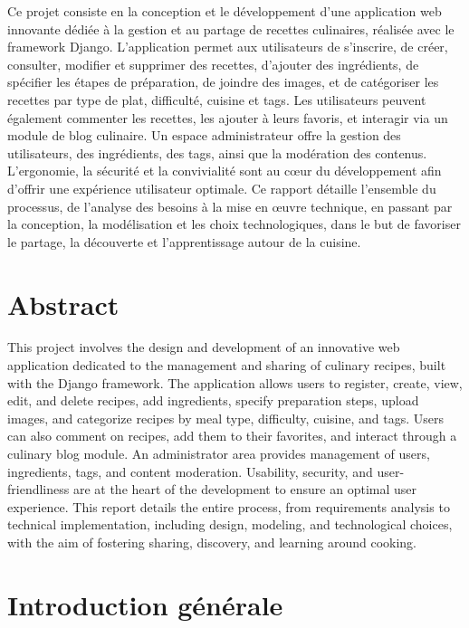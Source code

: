 \documentclass[12pt,a4paper]{report}
\begin{document}
Ce projet consiste en la conception et le développement d’une application web innovante dédiée à la gestion et au partage de recettes culinaires, réalisée avec le framework Django. L’application permet aux utilisateurs de s’inscrire, de créer, consulter, modifier et supprimer des recettes, d’ajouter des ingrédients, de spécifier les étapes de préparation, de joindre des images, et de catégoriser les recettes par type de plat, difficulté, cuisine et tags. Les utilisateurs peuvent également commenter les recettes, les ajouter à leurs favoris, et interagir via un module de blog culinaire. Un espace administrateur offre la gestion des utilisateurs, des ingrédients, des tags, ainsi que la modération des contenus. L’ergonomie, la sécurité et la convivialité sont au cœur du développement afin d’offrir une expérience utilisateur optimale. Ce rapport détaille l’ensemble du processus, de l’analyse des besoins à la mise en œuvre technique, en passant par la conception, la modélisation et les choix technologiques, dans le but de favoriser le partage, la découverte et l’apprentissage autour de la cuisine.
\chapter*{Abstract}

This project involves the design and development of an innovative web application dedicated to the management and sharing of culinary recipes, built with the Django framework. The application allows users to register, create, view, edit, and delete recipes, add ingredients, specify preparation steps, upload images, and categorize recipes by meal type, difficulty, cuisine, and tags. Users can also comment on recipes, add them to their favorites, and interact through a culinary blog module. An administrator area provides management of users, ingredients, tags, and content moderation. Usability, security, and user-friendliness are at the heart of the development to ensure an optimal user experience. This report details the entire process, from requirements analysis to technical implementation, including design, modeling, and technological choices, with the aim of fostering sharing, discovery, and learning around cooking.
\newpage
\listoffigures
\newpage
{}

\chapter*{Introduction générale}
\end{document}
